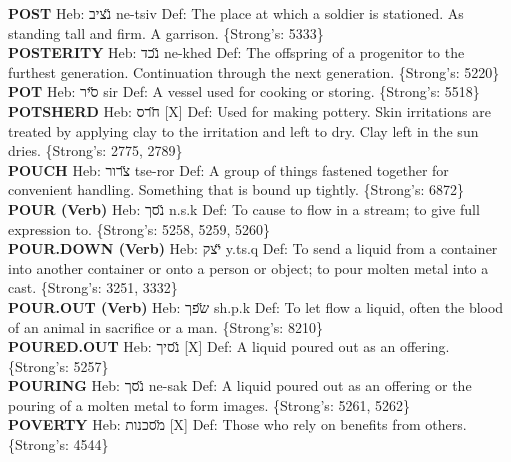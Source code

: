 {\textbf{POST} Heb: {\large\H נציב} ne-tsiv Def: The place at which a soldier is stationed. As standing tall and firm. A garrison. \{Strong's: 5333\}\hfill{}\\

\textbf{POSTERITY} Heb: {\large\H נכד} ne-khed Def: The offspring of a progenitor to the furthest generation. Continuation through the next generation. \{Strong's: 5220\}\hfill{}\\

\textbf{POT} Heb: {\large\H סיר} sir Def: A vessel used for cooking or storing. \{Strong's: 5518\}\hfill{}\\

\textbf{POTSHERD} Heb: {\large\H חרס} {[}X{]} Def: Used for making pottery. Skin irritations are treated by applying clay to the irritation and left to dry. Clay left in the sun dries. \{Strong's: 2775, 2789\}\hfill{}\\

\textbf{POUCH} Heb: {\large\H צרור} tse-ror Def: A group of things fastened together for convenient handling. Something that is bound up tightly. \{Strong's: 6872\}\hfill{}\\

\textbf{POUR (Verb)} Heb: {\large\H נסך} n.s.k Def: To cause to flow in a stream; to give full expression to. \{Strong's: 5258, 5259, 5260\}\hfill{}\\

\textbf{POUR.DOWN (Verb)} Heb: {\large\H יצק} y.ts.q Def: To send a liquid from a container into another container or onto a person or object; to pour molten metal into a cast. \{Strong's: 3251, 3332\}\hfill{}\\

\textbf{POUR.OUT (Verb)} Heb: {\large\H שפך} sh.p.k Def: To let flow a liquid, often the blood of an animal in sacrifice or a man. \{Strong's: 8210\}\hfill{}\\

\textbf{POURED.OUT} Heb: {\large\H נסיך} {[}X{]} Def: A liquid poured out as an offering. \{Strong's: 5257\}\hfill{}\\

\textbf{POURING} Heb: {\large\H נסך} ne-sak Def: A liquid poured out as an offering or the pouring of a molten metal to form images. \{Strong's: 5261, 5262\}\hfill{}\\

\textbf{POVERTY} Heb: {\large\H מסכנות} {[}X{]} Def: Those who rely on benefits from others. \{Strong's: 4544\}\hfill{}\\

}
